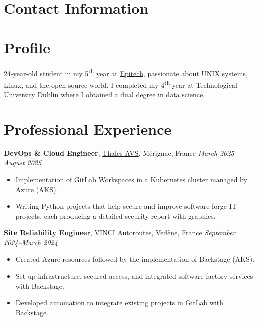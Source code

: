 \documentclass[margin,line]{../res}
\begin{document}
\newcommand{\myname}{Théo BORI}
\newlength{\mynamewidth}
\settowidth{\mynamewidth}{\namefont\myname}

\name{\hspace*{0.5\textwidth}\hspace{-0.5\mynamewidth} \myname \vspace*{.1in}}
\thispagestyle{empty}

\begin{resume}

	\section{\sc Contact Information}
	

	\vspace{-1em}

	\section{\sc Profile}
	24-year-old student in my 5\textsuperscript{th} year at \href{https://www.epitech.eu/}{Epitech}, passionate about UNIX systems, Linux, and the open-source world. I completed my 4\textsuperscript{th} year at \href{https://www.tudublin.ie/}{Technological University Dublin} where I obtained a dual degree in data science.

	\section{\sc Professional Experience}
	 {\bf DevOps \& Cloud Engineer}, \href{https://www.thalesgroup.com/fr}{Thales AVS}, Mérignac, France
	\hfill {\it March 2025--August 2025}
	\vspace*{.05in}
	\begin{itemize}
		\item Implementation of GitLab Workspaces in a Kubernetes cluster managed by Azure (AKS).
		\item Writing Python projects that help secure and improve software forge IT projects, each producing a detailed security report with graphics.
	\end{itemize}

	{\bf Site Reliability Engineer}, \href{https://www.vinci-autoroutes.com}{VINCI Autoroutes}, Vedène, France
	\hfill {\it September 2024--March 2024}
	\vspace*{.05in}
	\begin{itemize}
		\item Created Azure resources followed by the implementation of Backstage (AKS).
		\item Set up infrastructure, secured access, and integrated software factory services with Backstage.
		\item Developed automation to integrate existing projects in GitLab with Backstage.
	\end{itemize}


\end{resume}
\end{document}
